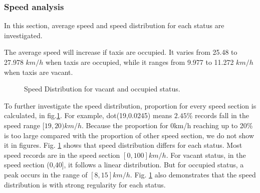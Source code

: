 \subsubsection{Speed analysis}
In this section, average speed and speed distribution for each status are investigated.

The average speed will increase if taxis are occupied. It varies from 25.48 to 27.978 $km/h$ when taxis are occupied, while it ranges from 9.977 to 11.272 $km/h$ when taxis are vacant.



\begin{figure}[htbp]
\centering
{}
\caption{Speed Distribution for vacant and occupied status.}\label{figure_speed_distribution}
\end{figure}

 To further investigate the speed distribution, proportion for every speed section is calculated, in fig.\ref{figure_speed_distribution}. For example, dot(19,0.0245) means $2.45\%$ records fall in the speed range $[19,20)km/h$. Because the proportion for 0km/h reaching up to 20\% is too large compared with the proportion of other speed section, we do not show it in figures.
Fig. \ref{figure_speed_distribution} shows that speed distribution differs for each status. Most speed records are in the speed section $[0,100] km/h$. For vacant status, in the speed section (0,40], it follows a linear distribution. But for occupied status, a peak occurs in the range of $[8,15] km/h$.  Fig. \ref{figure_speed_distribution} also demonstrates that the speed distribution is with strong regularity for each status.


